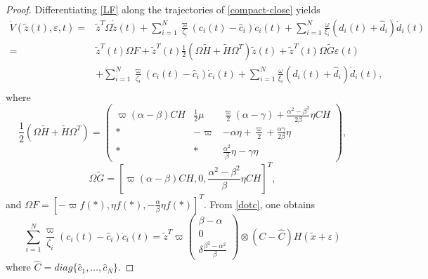 \documentclass[review]{elsarticle}
\begin{document}
\begin{proof}
	Differentiating \eqref{LF} along the trajectories of \eqref{compact-close} yields 
	\begin{equation}\label{dotV - 1}
	\begin{split}
	\dot V(\tilde z(t) ,\varepsilon, t) =
	& \tilde{z}^T \Omega\dot {\tilde z}(t) + \sum_{i=1}^{N} \frac{\varpi}{\zeta_i}(c_i (t) - \hat c_i) \dot c_i (t)+\sum_{i=1}^{N} \frac{\omega}{\xi_i}(d_i (t) + \hat{d}_i) \dot d_i (t)\\
	=&\tilde{z}^T(t) \Omega {F} + \tilde{z}^T(t) \frac{1}{2}\left(\Omega \widetilde{H}+ \widetilde{H}\Omega^T \right) \tilde{z}(t)+ \tilde{z}^T(t) \Omega \widetilde{G} \varepsilon(t)\\
	&+ \sum_{i=1}^{N} \frac{\varpi }{\zeta_i}(c_i (t) - \hat c_i) \dot c_i (t)+ \sum_{i=1}^{N} \frac{\omega}{\xi_i}(d_i (t) + \hat{d}_i) \dot d_i (t),\\%
	\end{split}
	\end{equation}
	where
	\begin{equation*}
	\frac{1}{2}\left(\Omega \widetilde{H}+ \widetilde{H}\Omega^T \right) = \begin{pmatrix}
	\varpi( \alpha- \beta ) C H   & \frac{1}{2}\mu &	\frac{\varpi }{2}(\alpha-\gamma)+\frac{\alpha^2-\beta^2}{2\beta}\eta C H  \\
	*								& -\varpi&-\alpha \eta+\frac{\varpi}{2}+ \frac{\alpha\gamma}{2\beta}\eta\\
	*& *& \frac{\alpha^2 }{\beta}\eta - \gamma\eta
	\end{pmatrix},
	\end{equation*}
	\begin{equation*}
\Omega\widetilde{G}=
\left[ \varpi(\alpha - \beta) C H ,0,\frac{\alpha^2-\beta^2}{\beta}\eta C H \right] ^T,
	\end{equation*}
	 and $\Omega F =\left[ 
	-\varpi f\left(* \right),
	\eta  f\left(* \right),
	-\frac{\alpha}{\beta} \eta  f\left(* \right)
	\right] ^T.$
	From \eqref{dotc}, one obtains    
	\begin{equation}\label{compact-dotc}
	\sum_{i=1}^{N} \frac{\varpi}{\zeta_i}(c_i (t) - \hat c_i) \dot c_i (t) =  \tilde{z}^T\varpi \begin{pmatrix}
	\beta-\alpha \\%
	0\\
	\delta\frac{\beta^2- \alpha^2 }{\beta}
	\end{pmatrix}\otimes (C- \hat C) H  (\tilde{x} + \varepsilon)
	\end{equation}
	where $\hat C = diag\{\hat c_1,\ldots,\hat c_N \}$.
	

\end{proof}
\end{document}
